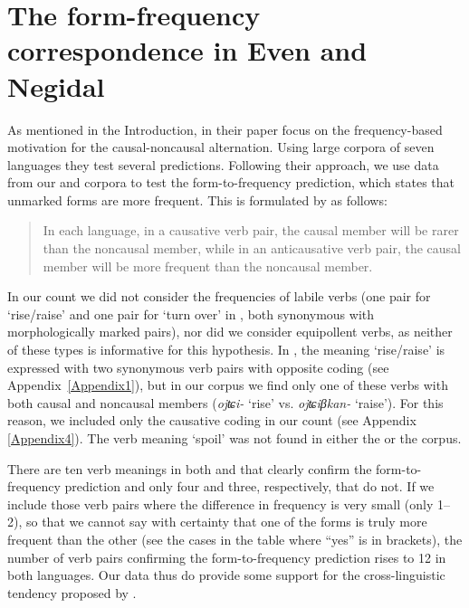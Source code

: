 \documentclass[output=paper,colorlinks,citecolor=brown]{langscibook}
\begin{document}
\section{The form-frequency correspondence in Even and Negidal}\label{section2.6}

As mentioned in the Introduction, in their paper \citet{Haspelmathetal2014} focus on the frequency-based motivation for the causal-noncausal alternation. Using large corpora of seven languages they test several predictions. Following their approach, we use data from our  and  corpora to test the form-to-frequency prediction, which states that unmarked forms are more frequent. This is formulated by \citet[597]{Haspelmathetal2014} as follows:

\begin{quote}
    In each language, in a causative verb pair, the causal member will be rarer than the noncausal member, while in an anticausative verb pair, the causal member will be more frequent than the noncausal member.
\end{quote}

In our count we did not consider the frequencies of labile verbs (one pair for ‘rise/raise’ and one pair for ‘turn over’ in , both synonymous with morphologically marked pairs), nor did we consider equipollent verbs, as neither of these types is informative for this hypothesis. In , the meaning ‘rise/raise’ is expressed with two synonymous verb pairs with opposite coding (see Appendix~\ref{Appendix1}), but in our corpus we find only one of these verbs with both causal and noncausal members (\textit{ojʨi-} ‘rise’ vs. \textit{ojʨiβkan-} ‘raise’). For this reason, we included only the causative coding in our count (see Appendix \ref{Appendix4}). The verb meaning ‘spoil’ was not found in either the  or the  corpus.

There are ten verb meanings in both  and  that clearly confirm the form-to-frequency prediction and only four and three, respectively, that do not. If we include those verb pairs where the difference in frequency is very small (only 1--2), so that we cannot say with certainty that one of the forms is truly more frequent than the other (see the cases in the table where “yes” is in brackets), the number of verb pairs confirming the form-to-frequency prediction rises to 12 in both languages. Our data thus do provide some support for the cross-linguistic tendency proposed by \citet{Haspelmathetal2014}.
\end{document}
